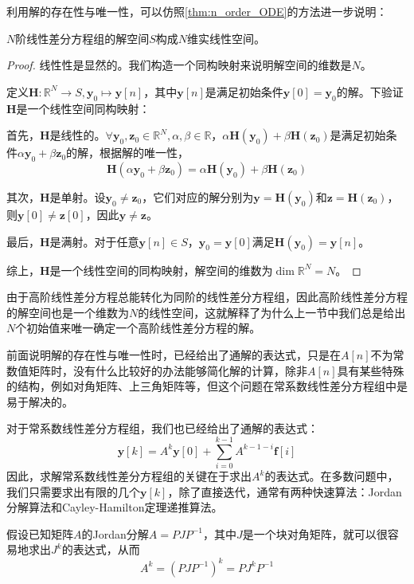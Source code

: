 利用解的存在性与唯一性，可以仿照\cref{thm:n_order_ODE}的方法进一步说明：
\begin{theorem}
    $N$阶线性差分方程组的解空间$S$构成$N$维实线性空间。
\end{theorem}
\begin{proof}
    线性性是显然的。我们构造一个同构映射来说明解空间的维数是$N$。

    定义$\mathbf{H}:\mathbb{R}^N\to S,\mathbf{y}_0\mapsto \mathbf{y}[n]$，其中$\mathbf{y}[n]$是满足初始条件$\mathbf{y}[0]=\mathbf{y}_0$的解。下验证$\mathbf{H}$是一个线性空间同构映射：

    首先，$\mathbf{H}$是线性的。$\forall \mathbf{y}_0,\mathbf{z}_0\in\mathbb{R}^N,\alpha,\beta\in\mathbb{R}$，$\alpha \mathbf{H}(\mathbf{y}_0) + \beta \mathbf{H}(\mathbf{z}_0)$是满足初始条件$\alpha \mathbf{y}_0 + \beta \mathbf{z}_0$的解，根据解的唯一性，
    $$\mathbf{H}(\alpha \mathbf{y}_0 + \beta \mathbf{z}_0) = \alpha \mathbf{H}(\mathbf{y}_0) + \beta \mathbf{H}(\mathbf{z}_0)$$

    其次，$\mathbf{H}$是单射。设$\mathbf{y}_0\neq\mathbf{z}_0$，它们对应的解分别为$\mathbf{y}=\mathbf{H}(\mathbf{y}_0)$和$\mathbf{z}=\mathbf{H}(\mathbf{z}_0)$，则$\mathbf{y}[0]\neq\mathbf{z}[0]$，因此$\mathbf{y}\neq\mathbf{z}$。

    最后，$\mathbf{H}$是满射。对于任意$\mathbf{y}[n]\in S$，$\mathbf{y}_0=\mathbf{y}[0]$满足$\mathbf{H}(\mathbf{y}_0)=\mathbf{y}[n]$。

    综上，$\mathbf{H}$是一个线性空间的同构映射，解空间的维数为$\dim \mathbb{R}^N=N$。
\end{proof}

由于高阶线性差分方程总能转化为同阶的线性差分方程组，因此高阶线性差分方程的解空间也是一个维数为$N$的线性空间，这就解释了为什么上一节中我们总是给出$N$个初始值来唯一确定一个高阶线性差分方程的解。

前面说明解的存在性与唯一性时，已经给出了通解的表达式，只是在$A[n]$不为常数值矩阵时，没有什么比较好的办法能够简化解的计算，除非$A[n]$具有某些特殊的结构，例如对角矩阵、上三角矩阵等，但这个问题在常系数线性差分方程组中是易于解决的。

对于常系数线性差分方程组，我们也已经给出了通解的表达式：
$$\mathbf{y}[k] = A^k \mathbf{y}[0] + \sum_{i=0}^{k-1} A^{k-1-i} \mathbf{f}[i]$$
因此，求解常系数线性差分方程组的关键在于求出$A^k$的表达式。在多数问题中，我们只需要求出有限的几个$\mathbf{y}[k]$，除了直接迭代，通常有两种快速算法：Jordan分解算法和Cayley-Hamilton定理递推算法。

假设已知矩阵$A$的Jordan分解$A=PJP^{-1}$，其中$J$是一个块对角矩阵，就可以很容易地求出$J^k$的表达式，从而
$$A^k =(PJP^{-1})^k = P J^k P^{-1}$$


